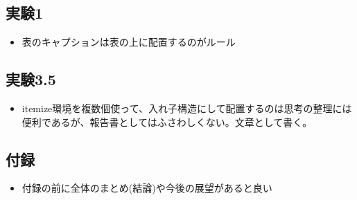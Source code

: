 \documentclass[../../main.tex]{subfiles}
\numberwithin{equation}{section}
\numberwithin{table}{section}
\numberwithin{figure}{section}
\begin{document}
  \subsection{実験1}
    \begin{itemize}
      \item 表のキャプションは表の上に配置するのがルール
    \end{itemize}
  \subsection{実験3.5}
    \begin{itemize}
      \item itemize環境を複数個使って、入れ子構造にして配置するのは思考の整理には便利であるが、報告書としてはふさわしくない。文章として書く。
    \end{itemize}
  \subsection{付録}
    \begin{itemize}
      \item 付録の前に全体のまとめ(結論)や今後の展望があると良い
    \end{itemize}
  
\end{document}
